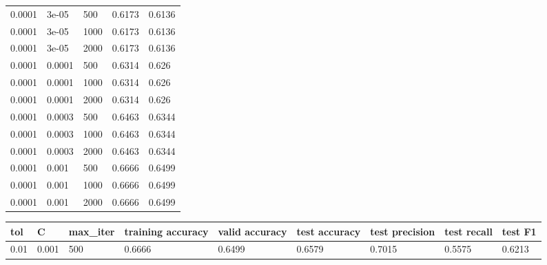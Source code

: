 \documentclass{article}%
\begin{document}
\begin{longtable}{l l l l}
0.0001&3e{-}05&500&0.6173&0.6136\\%
0.0001&3e{-}05&1000&0.6173&0.6136\\%
0.0001&3e{-}05&2000&0.6173&0.6136\\%
0.0001&0.0001&500&0.6314&0.626\\%
0.0001&0.0001&1000&0.6314&0.626\\%
0.0001&0.0001&2000&0.6314&0.626\\%
0.0001&0.0003&500&0.6463&0.6344\\%
0.0001&0.0003&1000&0.6463&0.6344\\%
0.0001&0.0003&2000&0.6463&0.6344\\%
0.0001&0.001&500&0.6666&0.6499\\%
0.0001&0.001&1000&0.6666&0.6499\\%
0.0001&0.001&2000&0.6666&0.6499\\%
\hline%
\end{longtable}%
\begin{longtable}{l l l l l l l l l}%
\hline%
tol&C&max\_iter&training accuracy&valid accuracy&test accuracy&test precision&test recall&test F1\\%
\hline%
\endhead%
\hline%
0.01&0.001&500&0.6666&0.6499&0.6579&0.7015&0.5575&0.6213\\%
\hline%
\end{longtable}%
\end{document}
